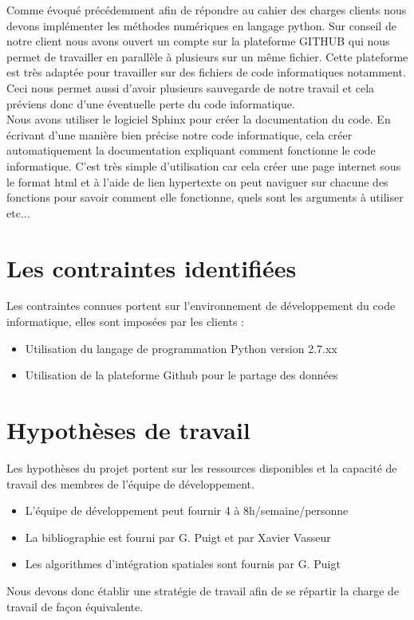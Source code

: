 \documentclass[a4paper,12pt]{report}
\theoremstyle{break}
\begin{document}
Comme évoqué précédemment afin de répondre au cahier des charges clients nous devons implémenter les méthodes numériques en langage python. Sur conseil de notre client nous avons ouvert un compte sur la plateforme GITHUB qui nous permet de travailler en parallèle à plusieurs sur un même fichier. Cette plateforme est très adaptée pour travailler sur des fichiers de code informatiques notamment. Ceci nous permet aussi d'avoir plusieurs sauvegarde de notre travail et cela préviens donc d'une éventuelle perte du code informatique. \\ 

Nous avons utiliser le logiciel Sphinx pour créer la documentation du code. En écrivant d'une manière bien précise notre code informatique, cela créer automatiquement la documentation expliquant comment fonctionne le code informatique. C'est très simple d'utilisation car cela créer une page internet sous le format html et à l'aide de lien hypertexte on peut naviguer sur chacune des fonctions pour savoir comment elle fonctionne, quels sont les arguments à utiliser etc...


\section{Les contraintes identifiées}
    Les contraintes connues portent sur l’environnement de développement du code informatique, elles sont imposées par les clients :
   \begin{itemize}[label=\textbullet]
   	\item Utilisation du langage de programmation Python version 2.7.xx
   	\item Utilisation de la plateforme Github pour le partage des données
    \end{itemize}

\section{Hypothèses de travail}
    Les hypothèses du projet portent sur les ressources disponibles et la capacité de travail des membres de l’équipe de développement.
   \begin{itemize}[label=\textbullet]
   	\item L’équipe de développement peut fournir 4 à 8h/semaine/personne
   	\item La bibliographie est fourni par G. Puigt et par Xavier Vasseur
   	\item  Les algorithmes d’intégration spatiales sont fournis par G. Puigt
    \end{itemize}
\vspace{3mm}
Nous devons donc établir une stratégie de travail afin de se répartir la charge de travail de façon équivalente. 
\end{document}

